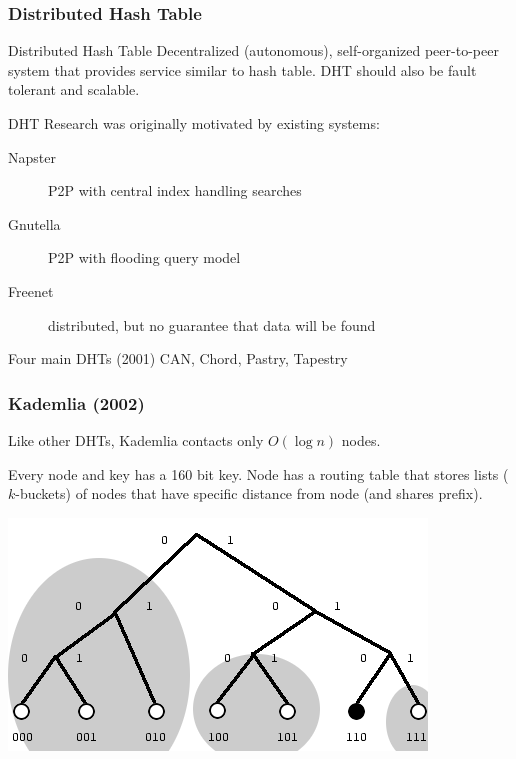 \documentclass{beamer}
\begin{document}
\begin{frame}
\frametitle{Distributed Hash Table}

\begin{block}{Distributed Hash Table}
Decentralized (autonomous), self-organized peer-to-peer system that provides service similar to hash table.
DHT should also be fault tolerant and scalable.
\end{block}

\pause
\begin{block}{}
DHT Research was originally motivated by existing systems:
\begin{description}
  \item[Napster] P2P with central index handling searches
  \item[Gnutella] P2P with flooding query model
  \item[Freenet] distributed, but no guarantee that data will be found
\end{description}
\end{block}

\begin{block}{Four main DHTs (2001)}
CAN, Chord, Pastry, Tapestry
\end{block}

\end{frame}

\begin{frame}
\frametitle{Kademlia \cite{maymounkov2002kademlia} (2002)}
\begin{block}{}
Like other DHTs, Kademlia contacts only $O(\log n)$ nodes.
\end{block}

\pause

\begin{block}{}
Every node and key has a 160 bit key. Node has a routing table that stores
lists ($k$-buckets) of nodes that have specific distance from node (and shares prefix).
\end{block}

\begin{center}
\includegraphics[width=0.6\linewidth]{kademlia.png}
\end{center}

\end{frame}
\end{document}
